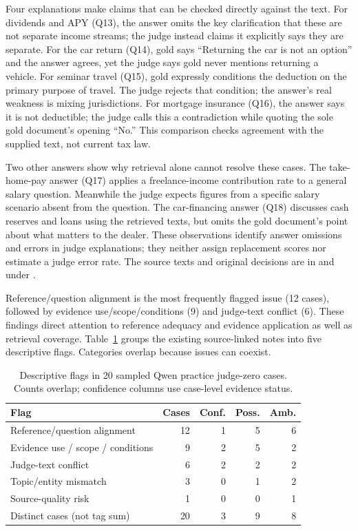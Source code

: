 Four explanations make claims that can be checked directly against the text.
For dividends and APY (Q13), the answer omits the key clarification that these
are not separate income streams; the judge instead claims it explicitly says
they are separate. For the car return (Q14), gold says ``Returning the car is
not an option'' and the answer agrees, yet the judge says gold never mentions
returning a vehicle. For seminar travel (Q15), gold expressly conditions the
deduction on the primary purpose of travel. The judge rejects that condition;
the answer's real weakness is mixing jurisdictions. For mortgage insurance
(Q16), the answer says it is not deductible; the judge calls this a
contradiction while quoting the sole gold document's opening ``No.''
This comparison checks agreement with the supplied text, not current tax law.

Two other answers show why retrieval alone cannot resolve these cases.
The take-home-pay answer (Q17) applies a freelance-income contribution rate
to a general salary question. Meanwhile the judge expects figures from a
specific salary scenario absent from the question. The car-financing answer
(Q18) discusses cash reserves and loans using the retrieved texts, but omits
the gold document's point about what matters to the dealer. These observations
identify answer omissions and errors in judge explanations; they neither assign
replacement scores nor estimate a judge error rate. The source texts and
original decisions are in  and
 under .

Reference/question alignment is the most frequently flagged issue (12 cases),
followed by evidence use/scope/conditions (9) and judge-text conflict (6).
These findings direct attention to reference adequacy and evidence application
as well as retrieval coverage.
Table~\ref{tab:diagnostic-flags} groups the existing source-linked notes into
five descriptive flags. Categories overlap because issues can coexist.

\begin{table}[ht]
\centering
\caption{Descriptive flags in 20 sampled Qwen practice judge-zero cases.
Counts overlap; confidence columns use case-level evidence status.}
\label{tab:diagnostic-flags}
\begin{tabular}{@{}lrrrr@{}}
\toprule
Flag & Cases & Conf. & Poss. & Amb. \\
\midrule
Reference/question alignment & 12 & 1 & 5 & 6 \\
Evidence use / scope / conditions & 9 & 2 & 5 & 2 \\
Judge-text conflict & 6 & 2 & 2 & 2 \\
Topic/entity mismatch & 3 & 0 & 1 & 2 \\
Source-quality risk & 1 & 0 & 0 & 1 \\
\midrule
Distinct cases (not tag sum) & 20 & 3 & 9 & 8 \\
\bottomrule
\end{tabular}
\end{table}

